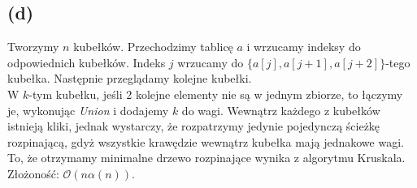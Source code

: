 \documentclass[12pt, a4paper]{article}
\newcommand{\MCALO}{\mathcal{O}}
\begin{document}
\subsection*{(d)}
Tworzymy $n$ kubełków. Przechodzimy tablicę $a$ i wrzucamy indeksy do
odpowiednich kubełków. Indeks $j$ wrzucamy do $\{a[j],a[j+1],a[j+2]\}$-tego
kubełka. Następnie przeglądamy kolejne kubełki.\\ W $k$-tym kubełku, jeśli $2$
kolejne elementy nie są w jednym zbiorze, to łączymy je, wykonując
\textit{Union} i dodajemy $k$ do wagi. Wewnątrz każdego z kubełków istnieją
kliki, jednak wystarczy, że rozpatrzymy jedynie pojedynczą ścieżkę rozpinającą,
gdyż wszystkie krawędzie wewnątrz kubełka mają jednakowe wagi. To, że otrzymamy
minimalne drzewo rozpinające wynika z algorytmu Kruskala.
Złożoność: $\MCALO(n\alpha(n))$.
\end{document}
